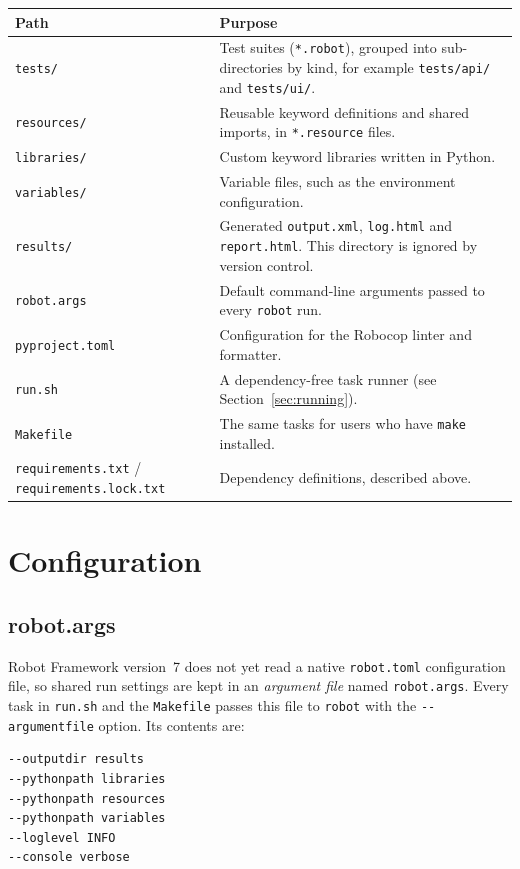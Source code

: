 \documentclass[a4paper,12pt]{article}
\newcommand{\code}[1]{\texttt{#1}}
\begin{document}
\begin{longtable}{p{} p{}}
\hline
\textbf{Path} & \textbf{Purpose} \\
\hline
\endhead
\code{tests/} &
  Test suites (\code{*.robot}), grouped into sub-directories by kind, for
  example \code{tests/api/} and \code{tests/ui/}. \\
\code{resources/} &
  Reusable keyword definitions and shared imports, in \code{*.resource} files. \\
\code{libraries/} &
  Custom keyword libraries written in Python. \\
\code{variables/} &
  Variable files, such as the environment configuration. \\
\code{results/} &
  Generated \code{output.xml}, \code{log.html} and \code{report.html}. This
  directory is ignored by version control. \\
\code{robot.args} &
  Default command-line arguments passed to every \code{robot} run. \\
\code{pyproject.toml} &
  Configuration for the Robocop linter and formatter. \\
\code{run.sh} &
  A dependency-free task runner (see Section~\ref{sec:running}). \\
\code{Makefile} &
  The same tasks for users who have \code{make} installed. \\
\code{requirements.txt} / \code{requirements.lock.txt} &
  Dependency definitions, described above. \\
\hline
\end{longtable}

\section{Configuration}

\subsection{robot.args}

Robot Framework version~7 does not yet read a native \code{robot.toml}
configuration file, so shared run settings are kept in an \emph{argument file}
named \code{robot.args}. Every task in \code{run.sh} and the \code{Makefile}
passes this file to \code{robot} with the \code{-{}-argumentfile} option. Its
contents are:

\begin{lstlisting}
--outputdir results
--pythonpath libraries
--pythonpath resources
--pythonpath variables
--loglevel INFO
--console verbose
\end{lstlisting}
\end{document}
